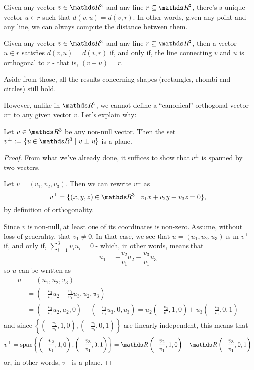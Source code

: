 \begin{prop}
	Given any vector $v\in \R^3$ and any line $r\subseteq \R^3$, there's a unique vector $u\in r$ such that $d(v,u)=d(v,r)$. In other words, given any point and any line, we can always compute the distance between them.
\end{prop}
\begin{cor}
	Given any vector $v\in \R^3$ and any line $r\subseteq \R^3$, then a vector $u\in r$ satisfies $d(v,u)=d(v,r)$ if, and only if, the line connecting $v$ and $u$ is orthogonal to $r$ - that is, $(v-u)\perp r$.
\end{cor}

Aside from those, all the results concerning shapes (rectangles, rhombi and circles) still hold.

However, unlike in $\R^2$, we cannot define a ``canonical'' orthogonal vector $v^\perp$ to any given vector $v$. Let's explain why:

\begin{prop}
	Let $v\in \R^3$ be any non-null vector. Then the set $v^\perp:=\{u\in \R^3\mid v\perp u\}$ is a plane.
\end{prop}
\begin{proof}
	From what we've already done, it suffices to show that $v^\perp$ is spanned by two vectors.
	
	Let $v=(v_1,v_2,v_3)$. Then we can rewrite $v^\perp$ as 
	\[v^\perp=\{(x,y,z)\in \R^3\mid v_1x+v_2y+v_3z=0\},\]by definition of orthogonality.
	
	Since $v$ is non-null, at least one of its coordinates is non-zero. Assume, without loss of generality, that $v_1\neq 0$. In that case, we see that $u=(u_1,u_2,u_3)$ is in $v^\perp$ if, and only if, $\sum_{i=1}^3 v_iu_i=0$ - which, in other words, means that
	\[u_1=-\frac{v_2}{v_1}u_2-\frac{v_3}{v_1}u_3\]so $u$ can be written as
	\begin{align*}
		u&=(u_1,u_2,u_3)\\
		&=\left(-\frac{v_2}{v_1}u_2-\frac{v_3}{v_1}u_3,u_2,u_3\right)\\
		&=\left(-\frac{v_2}{v_1}u_2,u_2,0\right)+\left(-\frac{v_3}{v_1}u_3,0,u_3\right)=u_2\left(-\frac{v_2}{v_1},1,0\right)+u_3\left(-\frac{v_3}{v_1},0,1\right)
	\end{align*}and since $\left\{\left(-\frac{v_2}{v_1},1,0\right),\left(-\frac{v_3}{v_1},0,1\right)\right\}$ are linearly independent, this means that $$v^\perp = \spen\left\{\left(-\frac{v_2}{v_1},1,0\right),\left(-\frac{v_3}{v_1},0,1\right)\right\}=\R\left(-\frac{v_2}{v_1},1,0\right)+\R\left(-\frac{v_3}{v_1},0,1\right)$$or, in other words, $v^\perp$ is a plane.
\end{proof}

